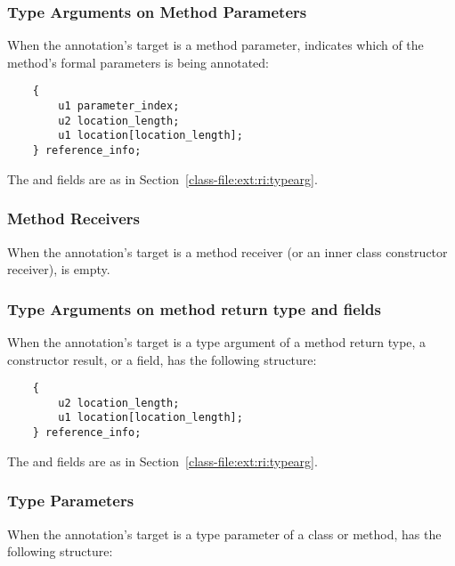 \documentclass[10pt]{article}
\begin{document}
\subsubsection{Type Arguments on Method Parameters\label{class-file:ext:ri:parameters}}

When the annotation's target is a method parameter, 
indicates which of the method's formal parameters is being annotated:

\begin{Verbatim}
    {
        u1 parameter_index;
        u2 location_length;
        u1 location[location_length];
    } reference_info;
\end{Verbatim}

The  and  fields are as in
Section~\ref{class-file:ext:ri:typearg}.

\subsubsection{Method Receivers\label{class-file:ext:ri:receiver}}

When the annotation's target is a method receiver (or an inner class
constructor receiver), 
is empty.

\subsubsection{Type Arguments on method return type and fields\label{class-file:ext:ri:return}}

When the annotation's target is a type argument of a method return type, a
constructor result, or a field,
 has the following structure:

\begin{Verbatim}
    {
        u2 location_length;
        u1 location[location_length];
    } reference_info;
\end{Verbatim}

The  and  fields are as in
Section~\ref{class-file:ext:ri:typearg}.


\subsubsection{Type Parameters\label{class-file:ext:ri:mtp}}

When the annotation's target is a type parameter of a class or method,
 has the following structure:
\end{document}
